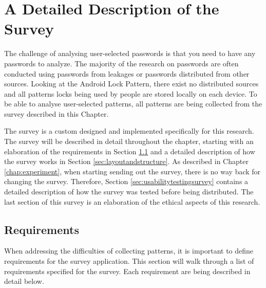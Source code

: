 \chapter{A Detailed Description of the Survey}\label{sec:survey}
  
  The challenge of analysing user-selected passwords is that you need to have any passwords to analyze. The majority of the research on passwords are often conducted using passwords from leakages or passwords distributed from other sources. Looking at the Android Lock Pattern, there exist no distributed sources and all patterns locks being used by people are stored locally on each device. To be able to analyse user-selected patterns, all patterns are being collected from the survey described in this Chapter. 

  The survey is a custom designed and implemented specifically for this research. The survey will be described in detail throughout the chapter, starting with an elaboration of the requirements in Section \ref{sec:requirementstosurvey} and a detailed description of how the survey works in Section \ref{sec:layoutandstructure}. As described in Chapter \ref{chap:experiment}, when starting sending out the survey, there is no way back for changing the survey. Therefore, Section \ref{sec:usabilitytestingsurvey} contains a detailed description of how the survey was tested before being distributed. The last section of this survey is an elaboration of the ethical aspects of this research. 

  \clearpage
  \section{Requirements}\label{sec:requirementstosurvey}

    When addressing the difficulties of collecting patterns, it is important to define requirements for the survey application. This section will walk through a list of requirements specified for the survey. Each requirement are being described in detail below.

